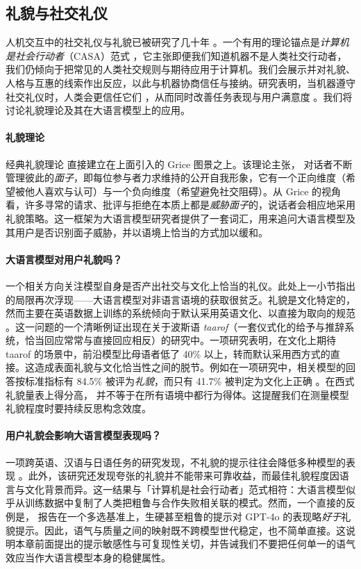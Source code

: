 \subsection{礼貌与社交礼仪}
人机交互中的社交礼仪与礼貌已被研究了几十年 \citep{ribino2023role}。一个有用的理论锚点是\emph{计算机是社会行动者}（CASA）范式 \citep{nass1994computers}，它主张即便我们知道机器不是人类社交行动者，我们仍倾向于把常见的人类社交规则与期待应用于计算机。我们会展示并对礼貌、人格与互惠的线索作出反应，以此与机器协商信任与接纳。研究表明，当机器遵守社交礼仪时，人类会更信任它们 \citep{miller2005}，从而同时改善任务表现与用户满意度 \citep{miyamoto2021}。我们将讨论礼貌理论及其在大语言模型上的应用。

\paragraph{礼貌理论}
经典礼貌理论 \citep[e.g.][]{brown1987politeness} 直接建立在上面引入的 Grice 图景之上。该理论主张，%
对话者不断管理彼此的\emph{面子}，即每位参与者力求维持的公开自我形象，它有一个正向维度（希望被他人喜欢与认可）与一个负向维度（希望避免社交阻碍）。从 Grice 的视角看，许多寻常的请求、批评与拒绝在本质上都是\emph{威胁面子}的，说话者会相应地采用礼貌策略。这一框架为大语言模型研究者提供了一套词汇，用来追问大语言模型及其用户是否识别面子威胁，并以语境上恰当的方式加以缓和。

\paragraph{大语言模型对用户礼貌吗？}
一个相关方向关注模型自身是否产出社交与文化上恰当的礼仪。此处上一小节指出的局限再次浮现——大语言模型对非语言语境的获取很贫乏。礼貌是文化特定的，然而主要在英语数据上训练的系统倾向于默认采用英语文化、以直接为取向的规范 \citep{havaldar2023comparing}。这一问题的一个清晰例证出现在关于波斯语 \emph{taarof}（一套仪式化的给予与推辞系统，恰当回应常常与直接回应相反）的研究中。一项研究表明，在文化上期待 taarof 的场景中，前沿模型比母语者低了 40\% 以上，转而默认采用西方式的直接。这造成表面礼貌与文化恰当性之间的脱节。例如在一项研究中，相关模型的回答按标准指标有 84.5\% 被评为{\em 礼貌}，而只有 41.7\% 被判定为文化上正确 \citep{goharisadr2025taarof}。在西式礼貌量表上得分高，%
并不等于在所有语境中都行为得体。这提醒我们在测量模型礼貌程度时要持续反思构念效度。

\paragraph{用户礼貌会影响大语言模型表现吗？} \label{sec:politeness}
一项跨英语、汉语与日语任务的研究发现，不礼貌的提示往往会降低多种模型的表现 \citep{yin-etal-2024-respect}。此外，该研究还发现夸张的礼貌并不能带来可靠收益，而最佳礼貌程度因语言与文化背景而异。这一结果与「计算机是社会行动者」范式相符：大语言模型似乎从训练数据中复制了人类把粗鲁与合作失败相关联的模式。然而，一个直接的反例是，\citet{dobariya2025tone} 报告在一个多选基准上，生硬甚至粗鲁的提示对 GPT-4o 的表现略\emph{好于}礼貌提示。因此，语气与质量之间的映射既不跨模型世代稳定，也不简单直接。这说明本章前面提出的提示敏感性与可复现性关切，并告诫我们不要把任何单一的语气效应当作大语言模型本身的稳健属性。

